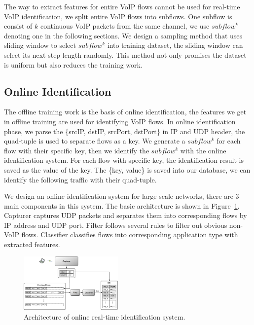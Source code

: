 \documentclass[conference]{IEEEtran}
\begin{document}
The way to extract features for entire VoIP flows cannot be used for real-time VoIP identification, we split entire VoIP flows into subflows. One subflow is consist of $k$ continuous VoIP packets from the same channel, we use $subflow^k$ denoting one in the following sections. We design a sampling method that uses sliding window to select $subflow^k$ into training dataset, the sliding window can select its next step length randomly. This method not only promises the dataset is uniform but also reduces the training work. 



\subsection{Online Identification}
\label{sec:onlineidentification}
The offline training work is the basis of online identification, the features we get in offline training are used for identifying VoIP flows. In online identification phase, we parse the \{srcIP, dstIP, srcPort, dstPort\} in IP and UDP header, the quad-tuple is used to separate flows as a key. We generate a $subflow^k$ for each flow with their specific key, then we identify the $subflow^k$ with the online identification system. For each flow with specific key, the identification result is saved as the value of the key. The \{key, value\} is saved into our database, we can identify the following traffic with their quad-tuple.

We design an online identification system for large-scale networks, there are 3 main components in this system. The basic architecture is shown in Figure~\ref{fig:online_architecture_new}. Capturer captures UDP packets and separates them into corresponding flows by IP address and UDP port. Filter follows several rules to filter out obvious non-VoIP flows. Classifier classifies flows into corresponding application type with extracted features. 
\begin{figure}[htp]
\begin{center}
\includegraphics[width=0.45\textwidth]{online_architecture_new.eps}
\caption{Architecture of online real-time identification system.}\label{fig:online_architecture_new}
\end{center}
\end{figure}
\end{document}
